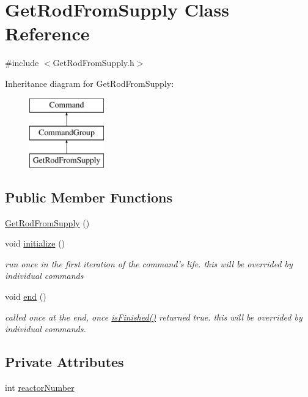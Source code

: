 \hypertarget{classGetRodFromSupply}{\section{Get\-Rod\-From\-Supply Class Reference}
\label{classGetRodFromSupply}
}


{\ttfamily \#include $<$Get\-Rod\-From\-Supply.\-h$>$}

Inheritance diagram for Get\-Rod\-From\-Supply\-:\begin{figure}[H]
\begin{center}
\leavevmode
\includegraphics[height=3.000000cm]{classGetRodFromSupply}
\end{center}
\end{figure}
\subsection*{Public Member Functions}
\begin{DoxyCompactItemize}
\item 
\hyperlink{classGetRodFromSupply_a8c06b54ce60f0547d4cb68465081c042}{Get\-Rod\-From\-Supply} ()
\item 
void \hyperlink{classGetRodFromSupply_ab843b3e54e3d6c51869453edf0ba1ac3}{initialize} ()
\begin{DoxyCompactList}\small\item\em run once in the first iteration of the command's life. this will be overrided by individual commands \end{DoxyCompactList}\item 
void \hyperlink{classGetRodFromSupply_a6cd4c581c1a6a0aac1ccf6667e532757}{end} ()
\begin{DoxyCompactList}\small\item\em called once at the end, once \hyperlink{classCommandGroup_a96807a2763adf9e21ebf2cb9e3574e3c}{is\-Finished()} returned true. this will be overrided by individual commands. \end{DoxyCompactList}\end{DoxyCompactItemize}
\subsection*{Private Attributes}
\begin{DoxyCompactItemize}
\item 
int \hyperlink{classGetRodFromSupply_aa1f52824921af63ffd7a17ed40f95b3f}{reactor\-Number}
\end{DoxyCompactItemize}
